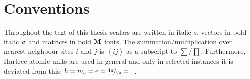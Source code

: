 \documentclass[ 10pt,
                DIV=10,
                headtopline=0.08em,
                headsepline=0.04em,
                headinclude,
                BCOR=6mm
              ]{scrbook}
\begin{document}
    
	\frontmatter



    \listoftodos
    \clearpage
    
    {\hypersetup{hidelinks}\tableofcontents}%

    \clearpage
    \printglossaries

    

    \section*{Conventions}
    Throughout the text of this thesis scalars are written in italic $s$, vectors in bold italic $\vb*{v}$ and matrices in bold $\textbf M$ fonts. The summation/multiplication over nearest neighbour sites $i$ and $j$ is $\left\langle ij \right\rangle$ as a subscript to $\sum$/$\prod$. Furthermore, Hartree atomic units are used in general and only in selected instances it is deviated from this: $\hbar = m_\mathrm{e} = \mathrm e = \nicefrac{4\pi}{\varepsilon_0} = 1$. 
    \nonfrenchspacing

    \mainmatter
    \renewcommand{\thechapter}{\Roman{chapter}}
    

    

    

    

    

    

    \cleardoublepage
    \printbibliography
\end{document}
